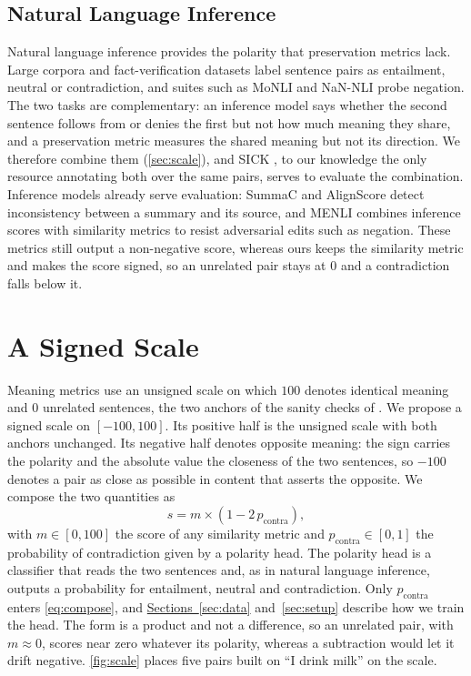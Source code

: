 \documentclass[11pt]{article}
\newcommand{\autorefpair}[3]{\hyperref[#2]{#1~\ref*{#2}} and~\hyperref[#3]{\ref*{#3}}}
\begin{document}
\subsection{Natural Language Inference}

Natural language inference provides the polarity that preservation metrics lack.
Large corpora \citep{williams2018mnli,nie2020anli} and fact-verification datasets \citep{thorne2018fever,schuster2021vitaminc} label sentence pairs as entailment, neutral or contradiction, and suites such as MoNLI \citep{geiger2020monli} and NaN-NLI \citep{truong2022nannli} probe negation.
The two tasks are complementary: an inference model says whether the second sentence follows from or denies the first but not how much meaning they share, and a preservation metric measures the shared meaning but not its direction.
We therefore combine them (\autoref{sec:scale}), and SICK \citep{marelli2014sick}, to our knowledge the only resource annotating both over the same pairs, serves to evaluate the combination.
Inference models already serve evaluation: SummaC \citep{laban2022summac} and AlignScore \citep{zha2023alignscore} detect inconsistency between a summary and its source, and MENLI \citep{chen2023menli} combines inference scores with similarity metrics to resist adversarial edits such as negation.
These metrics still output a non-negative score, whereas ours keeps the similarity metric and makes the score signed, so an unrelated pair stays at $0$ and a contradiction falls below it.

\section{A Signed Scale}
\label{sec:scale}

Meaning metrics use an unsigned scale on which $100$ denotes identical meaning and $0$ unrelated sentences, the two anchors of the sanity checks of \citet{beauchemin2023meaningbert}.
We propose a signed scale on $[-100, 100]$.
Its positive half is the unsigned scale with both anchors unchanged.
Its negative half denotes opposite meaning: the sign carries the polarity and the absolute value the closeness of the two sentences, so $-100$ denotes a pair as close as possible in content that asserts the opposite.
We compose the two quantities as
\begin{equation}
s = m \times (1 - 2\, p_{\mathrm{contra}}),
\label{eq:compose}
\end{equation}
with $m \in [0,100]$ the score of any similarity metric and $p_{\mathrm{contra}} \in [0,1]$ the probability of contradiction given by a polarity head.
The polarity head is a classifier that reads the two sentences and, as in natural language inference, outputs a probability for entailment, neutral and contradiction.
Only $p_{\mathrm{contra}}$ enters \autoref{eq:compose}, and \autorefpair{Sections}{sec:data}{sec:setup} describe how we train the head.
The form is a product and not a difference, so an unrelated pair, with $m \approx 0$, scores near zero whatever its polarity, whereas a subtraction would let it drift negative.
\autoref{fig:scale} places five pairs built on ``I drink milk'' on the scale.
\end{document}

